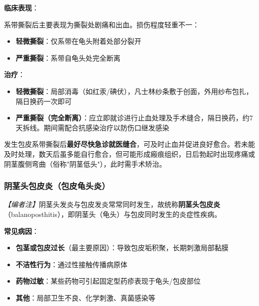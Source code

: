 \documentclass[12pt,a4paper,twoside]{ctexbook}
\begin{document}
\vspace{0.5em}
\noindent\textbf{临床表现}：

系带撕裂后主要表现为撕裂处剧痛和出血。损伤程度轻重不一：
\begin{itemize}
	\item \textbf{轻微撕裂}：仅系带在龟头附着处部分裂开
	\item \textbf{严重撕裂}：系带自龟头处完全断离
\end{itemize}

\vspace{0.5em}
\noindent\textbf{治疗}：
\begin{itemize}
	\item \textbf{轻微撕裂}：局部消毒（如红汞/碘伏），凡士林纱条敷于创面，外用纱布包扎，隔日换药一次即可
	\item \textbf{严重撕裂（完全断离）}：应立即就诊进行止血处理及手术缝合，隔日换药，约7天拆线。期间需配合抗感染治疗以防伤口继发感染
\end{itemize}

\begin{tcolorbox}[colback=pink!5!white,colframe=red!50!black,title=贴心小叮咛]
发生包皮系带撕裂后\textbf{最好尽快急诊就医缝合}，可及时止血并促进良好愈合。若未能及时处理，数天后虽多能自行愈合，但可能形成瘢痕组织，日后勃起时出现疼痛或阴茎腹侧弯曲（俗称"阴茎低头"），此时需手术矫治。
\end{tcolorbox}

\subsubsection{阴茎头包皮炎（包皮龟头炎）}

\noindent\textit{【编者注】}阴茎头发炎与包皮发炎常常同时发生，故统称\textbf{阴茎头包皮炎}（balanoposthitis），即阴茎头（龟头）与包皮同时发生的炎症性疾病。

\vspace{0.5em}
\noindent\textbf{常见病因}：

\begin{itemize}
	\item \textbf{包茎或包皮过长}（最主要原因）：导致包皮垢积聚，长期刺激局部黏膜
	\item \textbf{不洁性行为}：通过性接触传播病原体
	\item \textbf{药物过敏}：某些药物可引起固定型药疹表现于龟头/包皮部位
	\item \textbf{其他}：局部卫生不良、化学刺激、真菌感染等
\end{itemize}
\end{document}
